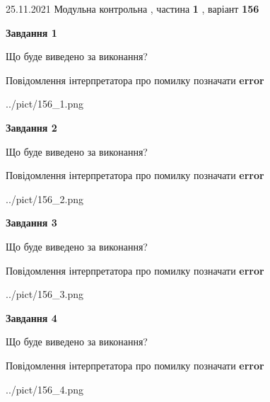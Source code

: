\documentclass[10pt, ukrainian]{article}
\begin{document}
{25.11.2021 Модульна контрольна , частина \textbf { 1 }, варіант  \No \textbf { 156 }\par}
{
\begin {large}

{\begin {center}\textbf{Завдання 1}\end {center}}\par
Що буде виведено за виконання? \par
Повідомлення інтерпретатора про помилку позначати \textbf{error}

\begin{center}
	{../pict/156_1.png}
\end{center}
\newpage

{\begin {center}\textbf{Завдання 2}\end {center}}\par
Що буде виведено за виконання? \par
Повідомлення інтерпретатора про помилку позначати \textbf{error}

\begin{center}
	{../pict/156_2.png}
\end{center}
\newpage

{\begin {center}\textbf{Завдання 3}\end {center}}\par
Що буде виведено за виконання? \par
Повідомлення інтерпретатора про помилку позначати \textbf{error}

\begin{center}
	{../pict/156_3.png}
\end{center}
\newpage

{\begin {center}\textbf{Завдання 4}\end {center}}\par
Що буде виведено за виконання? \par
Повідомлення інтерпретатора про помилку позначати \textbf{error}

\begin{center}
	{../pict/156_4.png}
\end{center}
\newpage


\end{large}}
\end{document}
